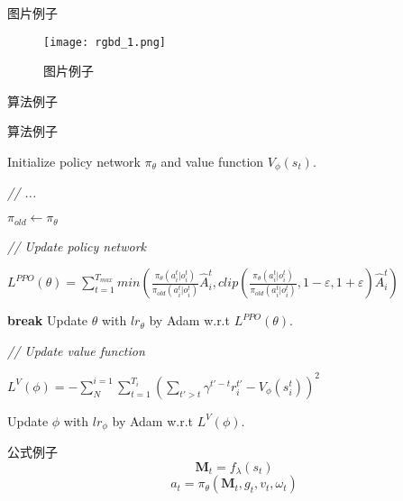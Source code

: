 \documentclass[cs4size,openany,oneside,UTF8,nofonts]{ctexbook}
\begin{document}

图片例子
\begin{figure}[htbp]
  \centering
  \texttt{[image: rgbd\_1.png]}
  \caption{图片例子}\label{图片例子}
  \vspace{-1em}
\end{figure}

算法例子
\begin{algorithm}
  \caption{算法例子}
  \label{alg111}
  Initialize policy network $\pi_\theta$ and value function $V_\phi (s_t)$.

  {
          \textit{// ...}

          $\pi_{old} \leftarrow \pi_{\theta}$

          \textit{// Update policy network}
          
          {
                  $L^{PPO}(\theta) = \sum_{t=1}^{T_{max}}{min(\frac{\pi_{\theta}(a_{i}^{t}|o_{i}^{t})}
                  {\pi_{old}(a_{i}^{t}|o_{i}^{t})}\hat{A}_{i}^{t}, 
                  clip(\frac{\pi_{\theta}(a_{i}^{t}|o_{i}^{t})}{\pi_{old}(a_{i}^{t}|o_{i}^{t})},1-\varepsilon ,1+\varepsilon )
                  \hat{A}_{i}^{t})}$

                  {
                          \textbf{break}
                  }
                  Update $\theta$ with $lr_{\theta}$ by Adam w.r.t $L^{PPO}(\theta)$.
          }

          \textit{// Update value function}

          {
                  $L^{V}(\phi) = -\sum_{N}^{i=1}\sum_{t=1}^{T_i}(\sum_{t'>t}\gamma ^{t'-t}r_{i}^{t'} - V_{\phi}(s_i^t))^2$

                  Update $\phi$ with $lr_{\phi}$ by Adam w.r.t $L^{V}(\phi)$.
          }

  }
\end{algorithm}

公式例子
\begin{equation}
  \textbf{M}_t = f_{\lambda}(s_t)
\end{equation}
\begin{equation}
  a_{t} = \pi_{\theta}(\textbf{M}_t, g_t, v_t, {\omega}_t)
\end{equation}
\end{document}
